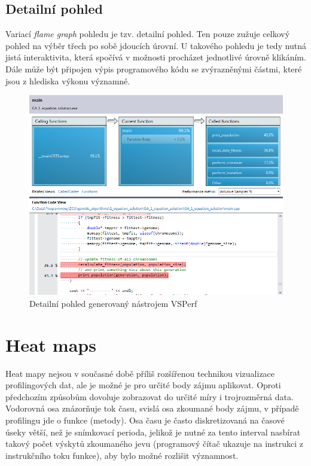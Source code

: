 \documentclass[czech,BP]{thesiskiv}
\begin{document}
\subsection{Detailní pohled}

Variací \emph{flame graph} pohledu je tzv. detailní pohled. Ten pouze zužuje celkový pohled na výběr třech po sobě jdoucích úrovní. U takového pohledu je tedy nutná jistá interaktivita, která spočívá v možnosti procházet jednotlivé úrovně klikáním. Dále může být připojen výpis programového kódu se zvýrazněnými částmi, které jsou z hlediska výkonu významné.

\begin{figure}[h]
    \centering
    \includegraphics[interpolate,width=1.0\textwidth]{img/prof_detailgraph.png}
    \caption{Detailní pohled generovaný nástrojem VSPerf}
    \label{obr:detailview}
\end{figure}

\section {Heat maps}

Heat mapy nejsou v současné době příliš rozšířenou technikou vizualizace profilingových dat, ale je možné je pro určité body zájmu aplikovat\cite{heatmapcite}. Oproti předchozím způsobům dovoluje zobrazovat do určité míry i trojrozměrná data. Vodorovná osa znázorňuje tok času, svislá osa zkoumané body zájmu, v případě profilingu jde o funkce (metody). Osa času je často diskretizovaná na časové úseky větší, než je snímkovací perioda, jelikož je nutné za tento interval nasbírat takový počet výskytů zkoumaného jevu (programový čítač ukazuje na instrukci z instrukčního toku funkce), aby bylo možné rozlišit významnost.
\end{document}
